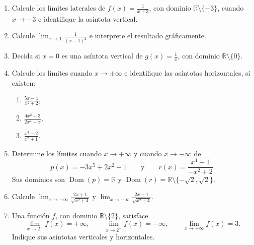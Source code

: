 \documentclass[10pt,a5paper]{article}
\begin{document}
\begin{ejercicios}
\begin{enumerate}
  \item Calcule los límites laterales de $\displaystyle f(x)=\frac{1}{x+3}$, con dominio $\mathbb{R}\setminus\{-3\}$, cuando $x\to-3$ e identifique la asíntota vertical.
  \item Calcule $\displaystyle\lim_{x\to1}\frac{1}{(x-1)^2}$ e interprete el resultado gráficamente.
  \item Decida si $x=0$ es una asíntota vertical de $\displaystyle g(x)=\frac{1}{x}$, con dominio $\mathbb{R}\setminus\{0\}$.
  \item Calcule los límites cuando $x\to\pm\infty$ e identifique las asíntotas horizontales, si existen:
  \begin{enumerate}
    \item $\displaystyle\frac{5x-1}{x^2+2}$,
    \item $\displaystyle\frac{4x^2+3}{2x^2-x}$,
    \item $\displaystyle\frac{x^3-2}{x^2+1}$.
  \end{enumerate}
  \item Determine los límites cuando $x\to+\infty$ y cuando $x\to-\infty$ de
  \[
    p(x)=-3x^5+2x^2-1
    \qquad\text{y}\qquad
    r(x)=\frac{x^4+1}{-x^2+2}.
  \]
  Sus dominios son $\operatorname{Dom}(p)=\mathbb{R}$ y $\operatorname{Dom}(r)=\mathbb{R}\setminus\{-\sqrt{2},\sqrt{2}\}$.
  \item Calcule $\displaystyle\lim_{x\to+\infty}\frac{2x+1}{\sqrt{x^2+4}}$ y $\displaystyle\lim_{x\to-\infty}\frac{2x+1}{\sqrt{x^2+4}}$.
  \item Una función $f$, con dominio $\mathbb{R}\setminus\{2\}$, satisface
  \[
    \lim_{x\to2^-}f(x)=+\infty,
    \qquad
    \lim_{x\to2^+}f(x)=-\infty,
    \qquad
    \lim_{x\to+\infty}f(x)=3.
  \]
  Indique sus asíntotas verticales y horizontales.
\end{enumerate}
\end{ejercicios}
\end{document}

